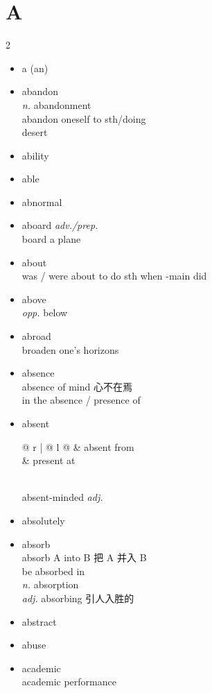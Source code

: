 \documentclass[../../book.tex]{subfiles}
\begin{document}
\section{A}
\raggedcolumns
\begin{multicols}{2}
\begin{itemize}
\item[-] a (an)
\item[-] abandon
\\\emph{n.} abandonment
\\abandon oneself to sth/doing
\\{\color{violet}desert}
\item[-] ability
\item[-] able
\item[-] abnormal
\item[-] aboard \emph{adv./prep.}
\\{\color{violet}board a plane}
\item[-] about
\\was / were about to do sth when \mbox{-main} did
\item[-] above
\\\emph{opp.} below
\item[-] abroad
\\{\color{violet}broaden one{\textquoteright}s horizons}
\item[-] absence
\\absence of mind 心不在焉
\\ in the absence / presence of
\item[-] absent
\\\begin{tabular}{@{} r | @{\hspace{0.1em}} l @{}}
 & absent from
\\& present at
\end{tabular}
\\absent-minded \emph{adj.}
\item[-] absolutely
\item[-] absorb
\\absorb A into B 把 A 并入 B
\\be absorbed in
\\\emph{n.} absorption
\\\emph{adj.} absorbing 引人入胜的
\item[-] abstract
\item[-] abuse
\item[-] academic
\\academic performance

\end{itemize}
\end{multicols}
\end{document}

